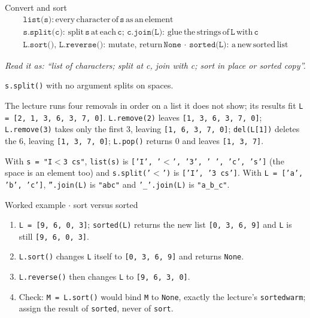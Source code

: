 \documentclass[11pt]{article}
\begin{document}
\begin{keepsection}
\begin{equationcard}{Convert and sort}
\[ \begin{gathered} \texttt{list(s)}:\, \text{every}\, \text{character}\, \text{of}\, \texttt{s}\, \text{as}\, \text{an}\, \text{element} \\ \texttt{s.split(c)}:\, \text{split}\, \texttt{s}\, \text{at}\, \text{each}\, \texttt{c};\, \texttt{c.join(L)}:\, \text{glue}\, \text{the}\, \text{strings}\, \text{of}\, \texttt{L}\, \text{with}\, \texttt{c} \\ \texttt{L.sort()},\, \texttt{L.reverse()}:\, \text{mutate},\, \text{return}\, \texttt{None}\, \cdot \, \texttt{sorted(L)}:\, \mathrm{a}\, \text{new}\, \text{sorted}\, \text{list} \end{gathered} \]
{\small \emph{Read it as: “list of characters; split at c, join with c; sort in place or sorted copy”.}\par  \texttt{s.split()} with no argument splits on spaces.}
\end{equationcard}

The lecture runs four removals in order on a list it does not show; its results fit \texttt{L = [2, 1, 3, 6, 3, 7, 0]}. \texttt{L.remove(2)} leaves \texttt{[1, 3, 6, 3, 7, 0]}; \texttt{L.remove(3)} takes only the first 3, leaving \texttt{[1, 6, 3, 7, 0]}; \texttt{del(L[1])} deletes the 6, leaving \texttt{[1, 3, 7, 0]}; \texttt{L.pop()} returns 0 and leaves \texttt{[1, 3, 7]}.

With \texttt{s = "I\ensuremath{<}3 cs"}, \texttt{list(s)} is \texttt{['I', '\ensuremath{<}', '3', ' ', 'c', 's']} (the space is an element too) and \texttt{s.split('\ensuremath{<}')} is \texttt{['I', '3 cs']}. With \texttt{L = ['a', 'b', 'c']}, \texttt{''.join(L)} is \texttt{"abc"} and \texttt{'\_'.join(L)} is \texttt{"a\_b\_c"}.

\begin{workedbox}{Worked example \ensuremath{\cdot} sort versus sorted}
\begin{enumerate}
\item \texttt{L = [9, 6, 0, 3]}; \texttt{sorted(L)} returns the new list \texttt{[0, 3, 6, 9]} and \texttt{L} is still \texttt{[9, 6, 0, 3]}.
\item \texttt{L.sort()} changes \texttt{L} itself to \texttt{[0, 3, 6, 9]} and returns \texttt{None}.
\item \texttt{L.reverse()} then changes \texttt{L} to \texttt{[9, 6, 3, 0]}.
\item Check: \texttt{M = L.sort()} would bind \texttt{M} to \texttt{None}, exactly the lecture’s \texttt{sortedwarm}; assign the result of \texttt{sorted}, never of \texttt{sort}.
\end{enumerate}
\end{workedbox}


\end{keepsection}
\end{document}
